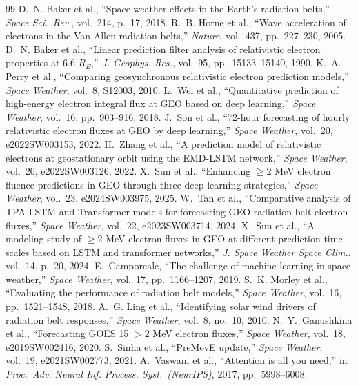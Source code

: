 \documentclass[conference]{IEEEtran}
\begin{document}
\begin{thebibliography}{99}
D.~N. Baker et al., ``Space weather effects in the Earth's radiation belts,''
\emph{Space Sci.\ Rev.}, vol.~214, p.~17, 2018.
R.~B. Horne et al., ``Wave acceleration of electrons in the Van Allen
radiation belts,'' \emph{Nature}, vol.~437, pp.~227--230, 2005.
D.~N. Baker et al., ``Linear prediction filter analysis of relativistic
electron properties at 6.6 \(R_E\),'' \emph{J. Geophys. Res.}, vol.~95,
pp.~15133--15140, 1990.
K.~A. Perry et al., ``Comparing geosynchronous relativistic electron
prediction models,'' \emph{Space Weather}, vol.~8, S12003, 2010.
L.~Wei et al., ``Quantitative prediction of high-energy electron integral flux
at GEO based on deep learning,'' \emph{Space Weather}, vol.~16,
pp.~903--916, 2018.
J.~Son et al., ``72-hour forecasting of hourly relativistic electron fluxes at
GEO by deep learning,'' \emph{Space Weather}, vol.~20, e2022SW003153, 2022.
H.~Zhang et al., ``A prediction model of relativistic electrons at
geostationary orbit using the EMD-LSTM network,''
\emph{Space Weather}, vol.~20, e2022SW003126, 2022.
X.~Sun et al., ``Enhancing \(\ge2\) MeV electron fluence predictions in GEO
through three deep learning strategies,'' \emph{Space Weather}, vol.~23,
e2024SW003975, 2025.
W.~Tan et al., ``Comparative analysis of TPA-LSTM and Transformer models
for forecasting GEO radiation belt electron fluxes,'' \emph{Space Weather}, vol.~22, e2023SW003714, 2024.
X.~Sun et al., ``A modeling study of \(\ge2\) MeV electron fluxes in GEO at
different prediction time scales based on LSTM and transformer networks,'' \emph{J. Space Weather Space Clim.},
vol.~14, p.~20, 2024.
E.~Camporeale, ``The challenge of machine learning in space weather,''
\emph{Space Weather}, vol.~17, pp.~1166--1207, 2019.
S.~K. Morley et al., ``Evaluating the performance of radiation belt models,''
\emph{Space Weather}, vol.~16, pp.~1521--1548, 2018.
A.~G. Ling et al., ``Identifying solar wind drivers of radiation belt
responses,'' \emph{Space Weather}, vol.~8, no.~10, 2010.
N.~Y.~Ganushkina et al., ``Forecasting GOES 15 \(>2\) MeV electron fluxes,''
\emph{Space Weather}, vol.~18, e2019SW002416, 2020.
S.~Sinha et al., ``PreMevE update,'' \emph{Space Weather}, vol.~19,
e2021SW002773, 2021.
A.~Vaswani et al., ``Attention is all you need,'' in \emph{Proc.\ Adv. Neural Inf. Process. Syst.\ (NeurIPS)}, 2017,
pp.~5998--6008.
\end{thebibliography}
\end{document}

